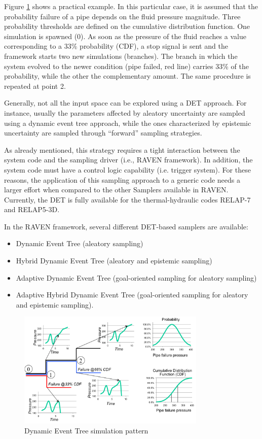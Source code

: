 Figure \ref{fig:DETschemeExample} shows a practical example. In this particular case, it is assumed that the
probability failure of a pipe depends on the fluid pressure magnitude. Three probability thresholds are defined on
the cumulative distribution function. One simulation is spawned (0). As soon as the pressure of the fluid reaches a
value corresponding to a 33\% probability (CDF), a stop signal is sent and the framework starts two new
simulations (branches). The branch in which the system evolved to the newer condition (pipe failed, red line)
carries 33\% of the probability, while the other the complementary amount. The same procedure is repeated at
point 2.

Generally, not all the input space can be explored using a DET approach. For instance, usually the parameters affected by aleatory uncertainty are sampled using a dynamic event tree approach, while the ones characterized by epistemic uncertainty are sampled through ``forward'' sampling strategies.

As already mentioned, this strategy requires a tight interaction between the system code and the sampling driver (i.e., RAVEN framework). In addition, the system code must have a control logic capability (i.e. trigger system). For these reasons, the application of this sampling approach to a generic code needs a larger effort when compared to the other Samplers available in RAVEN. Currently, the DET is fully available for the thermal-hydraulic codes RELAP-7 and RELAP5-3D.

In the RAVEN framework, several different DET-based samplers are available:
\begin{itemize}
\item Dynamic Event Tree (aleatory sampling)
\item Hybrid Dynamic Event Tree (aleatory and epistemic sampling)
\item Adaptive Dynamic Event Tree (goal-oriented sampling for aleatory sampling)
\item Adaptive Hybrid Dynamic Event Tree (goal-oriented sampling for aleatory and epistemic sampling).
\end{itemize}

\begin{figure}
  \centering
  \includegraphics[width=0.8\textwidth]  {pics/DETscheme.png}
  \caption{Dynamic Event Tree simulation pattern}
  \label{fig:DETschemeExample}
\end{figure}

